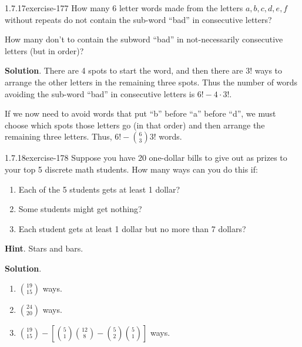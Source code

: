 \documentclass[twoside,11pt,]{book}
\numberwithin{equation}{chapter}
\begin{document}
\begin{divisionsolution}{1.7.17}{}{exercise-177}%
\hypertarget{p-2851}{}%
How many 6 letter words made from the letters \(a,b,c,d,e,f\) without repeats do not contain the sub-word ``bad'' in consecutive letters?%
\par
\hypertarget{p-2853}{}%
How many don't to contain the subword ``bad'' in not-necessarily consecutive letters (but in order)?%
\par\smallskip%
\noindent\textbf{Solution}.\quad%
\hypertarget{p-2855}{}%
There are 4 spots to start the word, and then there are \(3!\) ways to arrange the other letters in the remaining three spots. Thus the number of words avoiding the sub-word ``bad'' in consecutive letters is \(6! - 4\cdot 3!\text{.}\)%
\par
\hypertarget{p-2856}{}%
If we now need to avoid words that put ``b'' before ``a'' before ``d'', we must choose which spots those letters go (in that order) and then arrange the remaining three letters. Thus, \(6! - {6 \choose 3}3!\) words.%
\end{divisionsolution}%
\begin{divisionsolution}{1.7.18}{}{exercise-178}%
\hypertarget{p-2866}{}%
Suppose you have 20 one-dollar bills to give out as prizes to your top 5 discrete math students. How many ways can you do this if:\leavevmode%
\begin{enumerate}[label=(\alph*)]
\item\hypertarget{li-1670}{}\hypertarget{p-2867}{}%
Each of the 5 students gets at least 1 dollar?%
\item\hypertarget{li-1671}{}\hypertarget{p-2869}{}%
Some students might get nothing?%
\item\hypertarget{li-1672}{}\hypertarget{p-2871}{}%
Each student gets at least 1 dollar but no more than 7 dollars?%
\end{enumerate}
%
\par\smallskip%
\noindent\textbf{Hint}.\quad%
\hypertarget{p-2873}{}%
Stars and bars.%
\par\smallskip%
\noindent\textbf{Solution}.\quad%
\hypertarget{p-2874}{}%
\leavevmode%
\begin{enumerate}[label=(\alph*)]
\item\hypertarget{li-1673}{}\hypertarget{p-2875}{}%
\({19 \choose 15}\) ways.%
\item\hypertarget{li-1674}{}\hypertarget{p-2876}{}%
\({24 \choose 20}\) ways.%
\item\hypertarget{li-1675}{}\hypertarget{p-2877}{}%
\({19 \choose 15} - \left[{5 \choose 1}{12 \choose 8} - {5 \choose 2}{5 \choose 1} \right]\) ways.%
\end{enumerate}
%
\end{divisionsolution}%
\end{document}
